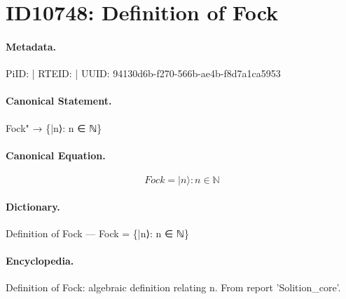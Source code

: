 \section*{ID10748: Definition of Fock}
\paragraph{Metadata.}
PiID:  | RTEID:  | UUID: 94130d6b-f270-566b-ae4b-f8d7a1ca5953

\paragraph{Canonical Statement.}
Fock" → \{|n⟩: n ∈ ℕ\}

\paragraph{Canonical Equation.}
\[
Fock = {|n⟩: n ∈ ℕ}
\]

\paragraph{Dictionary.}
Definition of Fock — Fock = \{|n⟩: n ∈ ℕ\}

\paragraph{Encyclopedia.}
Definition of Fock: algebraic definition relating n. From report 'Solition\_core'.
